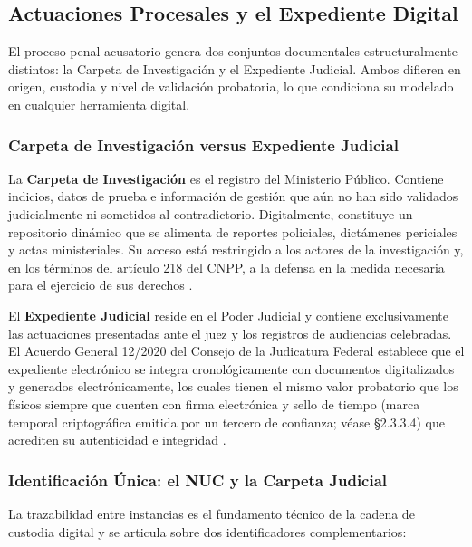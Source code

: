 \subsection{Actuaciones Procesales y el Expediente Digital}\label{sec:actuaciones-expediente}

El proceso penal acusatorio genera dos conjuntos documentales estructuralmente distintos: la Carpeta de Investigación y el Expediente Judicial. Ambos difieren en origen, custodia y nivel de validación probatoria, lo que condiciona su modelado en cualquier herramienta digital.

\subsubsection{Carpeta de Investigación versus Expediente Judicial}

La \textbf{Carpeta de Investigación} es el registro del Ministerio Público. Contiene indicios, datos de prueba e información de gestión que aún no han sido validados judicialmente ni sometidos al contradictorio. Digitalmente, constituye un repositorio dinámico que se alimenta de reportes policiales, dictámenes periciales y actas ministeriales. Su acceso está restringido a los actores de la investigación y, en los términos del artículo 218 del CNPP, a la defensa en la medida necesaria para el ejercicio de sus derechos \cite{cnpp2021}.

El \textbf{Expediente Judicial} reside en el Poder Judicial y contiene exclusivamente las actuaciones presentadas ante el juez y los registros de audiencias celebradas. El Acuerdo General 12/2020 del Consejo de la Judicatura Federal establece que el expediente electrónico se integra cronológicamente con documentos digitalizados y generados electrónicamente, los cuales tienen el mismo valor probatorio que los físicos siempre que cuenten con firma electrónica y sello de tiempo (marca temporal criptográfica emitida por un tercero de confianza; véase \S2.3.3.4) que acrediten su autenticidad e integridad \cite{cjf_expediente2020}.

\subsubsection{Identificación Única: el NUC y la Carpeta Judicial}

La trazabilidad entre instancias es el fundamento técnico de la cadena de custodia digital y se articula sobre dos identificadores complementarios:


